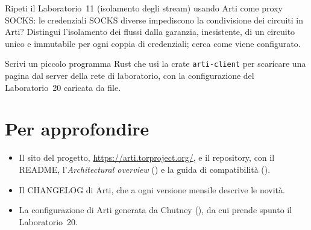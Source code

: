 \begin{esercizio}[2]\label{es:30-isolamento}
Ripeti il Laboratorio~11 (isolamento degli stream) usando Arti come proxy SOCKS: le credenziali SOCKS diverse impediscono la condivisione dei circuiti in Arti? Distingui l'isolamento dei flussi dalla garanzia, inesistente, di un circuito unico e immutabile per ogni coppia di credenziali; cerca come viene configurato.
\end{esercizio}

\begin{esercizio}[3]\label{es:30-libreria}
Scrivi un piccolo programma Rust che usi la crate \texttt{arti-client} per scaricare una pagina dal server della rete di laboratorio, con la configurazione del Laboratorio~20 caricata da file.
\end{esercizio}

\section*{Per approfondire}
\begin{itemize}
  \item Il sito del progetto, \url{https://arti.torproject.org/}, e il repository, con il README, l'\emph{Architectural overview} () e la guida di compatibilità ().
  \item Il CHANGELOG di Arti, che a ogni versione mensile descrive le novità.
  \item La configurazione di Arti generata da Chutney (), da cui prende spunto il Laboratorio~20.
\end{itemize}
